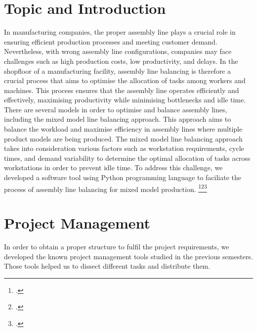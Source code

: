 \pagestyle{fancy}

\section{Topic and Introduction}
\label{sec:Topic_and_Introduction}
In manufacturing companies, the proper assembly line plays a crucial role in ensuring efficient production processes and meeting customer demand. Nevertheless, with wrong assembly line configurations, companies may face challenges such as high production costs, low productivity, and delays. In the shopfloor of a manufacturing facility, assembly line balancing is therefore a crucial process that aims to optimise the allocation of tasks among workers and machines. This process ensures that the assembly line operates efficiently and effectively, maximising productivity while minimising bottlenecks and idle time. There are several models in order to optimise and balance assembly lines, including the mixed model line balancing approach. This approach aims to balance the workload and maximise efficiency in assembly lines where multiple product models are being produced. The mixed model line balancing approach takes into consideration various factors such as workstation requirements, cycle times, and demand variability to determine the optimal allocation of tasks across workstations in order to prevent idle time. To address this challenge, we developed a software tool using Python programming language to faciliate the process of assembly line balancing for mixed model production. \footcite{friedli2010pathway}\footcite{rane-2017}\footcite{yusuf2020mixed}
\vspace{-0.3cm}
\section{Project Management}
In order to obtain a proper structure to fulfil the project requirements, we developed the known project management tools studied in the previous semesters. Those tools helped us to dissect different tasks and distribute them.

